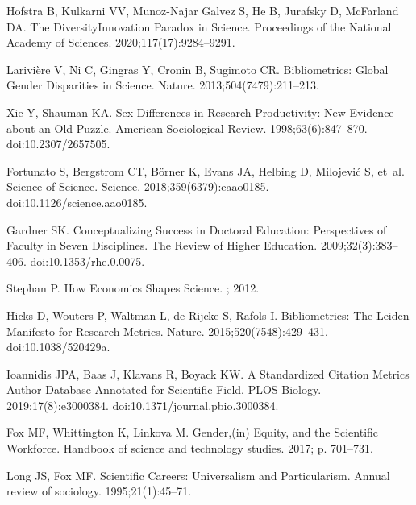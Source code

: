 \documentclass[
  10pt,
  letterpaper,
]{article}
\begin{document}
\renewcommand{\bibsection}{}
\begin{thebibliography}{10}

Hofstra B, Kulkarni VV, {Munoz-Najar Galvez} S, He B, Jurafsky D, McFarland DA.
\newblock The Diversity\textendash Innovation Paradox in Science.
\newblock Proceedings of the National Academy of Sciences. 2020;117(17):9284--9291.

Larivi{\`e}re V, Ni C, Gingras Y, Cronin B, Sugimoto CR.
\newblock Bibliometrics: {{Global}} Gender Disparities in Science.
\newblock Nature. 2013;504(7479):211--213.

Xie Y, Shauman KA.
\newblock Sex {{Differences}} in {{Research Productivity}}: {{New Evidence}} about an {{Old Puzzle}}.
\newblock American Sociological Review. 1998;63(6):847--870.
\newblock doi:{10.2307/2657505}.

Fortunato S, Bergstrom CT, B{\"o}rner K, Evans JA, Helbing D, Milojevi{\'c} S, et~al.
\newblock Science of Science.
\newblock Science. 2018;359(6379):eaao0185.
\newblock doi:{10.1126/science.aao0185}.

Gardner SK.
\newblock Conceptualizing {{Success}} in {{Doctoral Education}}: {{Perspectives}} of {{Faculty}} in {{Seven Disciplines}}.
\newblock The Review of Higher Education. 2009;32(3):383--406.
\newblock doi:{10.1353/rhe.0.0075}.

Stephan P.
\newblock How Economics Shapes Science.
; 2012.

Hicks D, Wouters P, Waltman L, {de Rijcke} S, Rafols I.
\newblock Bibliometrics: {{The Leiden Manifesto}} for Research Metrics.
\newblock Nature. 2015;520(7548):429--431.
\newblock doi:{10.1038/520429a}.

Ioannidis JPA, Baas J, Klavans R, Boyack KW.
\newblock A Standardized Citation Metrics Author Database Annotated for Scientific Field.
\newblock PLOS Biology. 2019;17(8):e3000384.
\newblock doi:{10.1371/journal.pbio.3000384}.

Fox MF, Whittington K, Linkova M.
\newblock Gender,(in) Equity, and the Scientific Workforce.
\newblock Handbook of science and technology studies. 2017; p. 701--731.

Long JS, Fox MF.
\newblock Scientific Careers: {{Universalism}} and Particularism.
\newblock Annual review of sociology. 1995;21(1):45--71.


\end{thebibliography}
\end{document}
